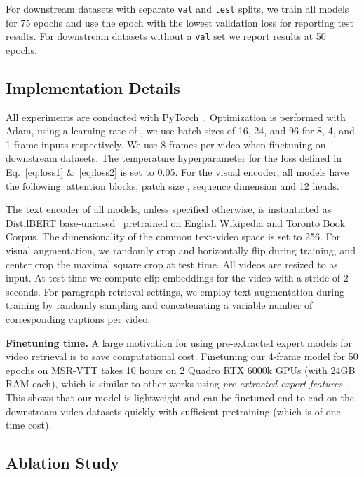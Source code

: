 \documentclass[10pt,twocolumn,letterpaper]{article}
\begin{document}
For downstream datasets with separate \texttt{val} and \texttt{test} splits, we train all models for 75 epochs and use the epoch with the lowest validation loss for reporting test results. For downstream datasets without a \texttt{val} set we report results at 50 epochs.

\subsection{Implementation Details}
\label{subsec:implementation}
All experiments are conducted with PyTorch~\cite{NEURIPS2019_9015}. Optimization is performed with Adam, using a learning rate of , we use batch sizes of 16, 24, and 96 for 8, 4, and 1-frame inputs respectively. We use 8 frames per video when finetuning on downstream datasets. The temperature hyperparameter  for the loss defined in Eq.~\ref{eq:loss1} \&~\ref{eq:loss2} is set to 0.05.
For the visual encoder, all models have the following:  attention blocks, patch size , sequence dimension  and 12 heads.

The text encoder of all models, unless specified otherwise, is instantiated as DistilBERT base-uncased~\cite{distilbert} pretrained on English Wikipedia and Toronto Book Corpus. The dimensionality of the common text-video space is set to 256. For visual augmentation, we randomly crop and horizontally flip during training, and center crop the maximal square crop at test time. All videos are resized to  as input. At test-time we compute clip-embeddings for the video with a stride of 2 seconds.
For paragraph-retrieval settings, we employ text augmentation during training by randomly sampling and concatenating a variable number of corresponding captions per video.

\noindent\textbf{Finetuning time.}
A large motivation for using pre-extracted expert models for video retrieval is to save computational cost. Finetuning our 4-frame model for 50 epochs on MSR-VTT takes 10 hours on 2 Quadro RTX 6000k GPUs (with 24GB RAM each), which is similar to other works using \textit{pre-extracted expert features}~\cite{patrick2020support}. This shows that our model is lightweight and can be finetuned end-to-end on the downstream video datasets quickly with sufficient pretraining (which is of one-time cost).
\subsection{Ablation Study}
\label{subsec:ablation}
\end{document}
